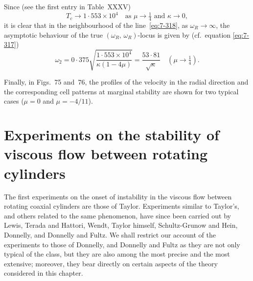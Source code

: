 Since (see the first entry in Table~XXXV)
\begin{equation}
\label{eq:7-319}
T_c \to 1{\cdot}553\times10^4 \quad \text{as } \mu \to \tfrac{1}{4}
  \text{ and } \kappa \to 0,
\end{equation}
it is clear that in the neighbourhood of the line~\eqref{eq:7-318}, as $\omega_R \to \infty$, the
asymptotic behaviour of the true $(\omega_R,\,\omega_R)$-locus is given by (cf.\ equation
\eqref{eq:7-317})
\begin{equation}
\label{eq:7-320}
\omega_2 = 0{\cdot}375\sqrt{\frac{1{\cdot}553\times10^4}{\kappa(1-4\mu)}}
  = \frac{53{\cdot}81}{\sqrt{\kappa}} \quad (\mu \to \tfrac{1}{4}).
\end{equation}


Finally, in Figs.~75 and~76, the profiles of the velocity in the radial
direction and the corresponding cell patterns at marginal stability are
shown for two typical cases ($\mu = 0$ and $\mu = -4/11$).



\section{Experiments on the stability of viscous flow between rotating cylinders}\label{sec:7-74}

The first experiments on the onset of instability in the viscous flow
between rotating coaxial cylinders are those of Taylor.  Experiments
similar to Taylor's, and others related to the same phenomenon, have
since been carried out by Lewis, Terada and Hattori, Wendt, Taylor
himself, Schultz-Grunow and Hein, Donnelly, and Donnelly and Fultz.
We shall restrict our account of the experiments to those of Donnelly,
and Donnelly and Fultz as they are not only typical of the class, but they
are also among the most precise and the most extensive; moreover, they
bear directly on certain aspects of the theory considered in this chapter.

